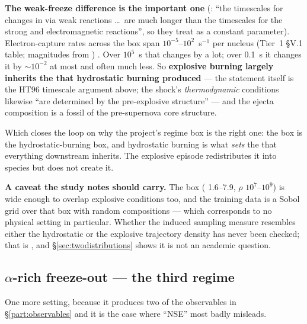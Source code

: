 \textbf{The weak-freeze difference is the important one}
(\citealt[\S 2]{hix1996}: ``the timescales for changes in \Ye{} via weak
reactions \ldots\ are much longer than the timescales for the strong and
electromagnetic reactions'', so they treat \Ye{} as a constant parameter).
Electron-capture rates across the box span $10^{-5}$--$10^{2}$~s$^{-1}$ per
nucleus (Tier~1 \S V.1 table; magnitudes from \citealt[Figs.~5--6]{langanke2000})
. Over $10^{5}$~s that changes \Ye{} by a lot; over
0.1~s it changes it by $\sim 10^{-2}$ at most and often much less. So
\textbf{explosive burning largely inherits the \Ye{} that hydrostatic burning
produced} --- the \Ye{} statement itself is the HT96 timescale argument above;
the shock's \emph{thermodynamic} conditions likewise ``are determined by the
pre-explosive structure'' \citep{woosley2007} --- and the ejecta composition
is a fossil of the pre-supernova core structure.

Which closes the loop on why the project's regime box is the right one: the box
is the hydrostatic-burning box, and hydrostatic burning is what \emph{sets} the
\Ye{} that everything downstream inherits. The explosive episode redistributes
it into species but does not create it.

\textbf{A caveat the study notes should carry.} The box (\Tn{} 1.6--7.9, $\rho$
$10^{7}$--$10^{9}$) is wide enough to overlap explosive conditions too, and the
training data is a Sobol grid over that box with random compositions --- which
corresponds to no physical setting in particular. Whether the induced sampling
measure resembles either the hydrostatic or the explosive trajectory density
has never been checked; that is , and
\S\ref{sec:twodistributions} shows it is not an academic question.

\subsection{\texorpdfstring{$\alpha$}{alpha}-rich freeze-out --- the third regime}
\label{sec:alpharich}

One more setting, because it produces two of the observables in
\S\ref{part:observables} and it is the case where ``NSE'' most badly misleads.

